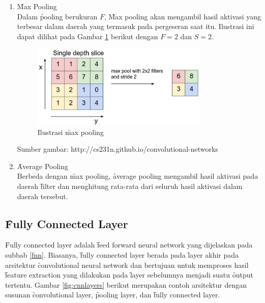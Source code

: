 \begin{enumerate}
	\item \f{Max Pooling} \\
	Dalam \f{pooling} berukuran $F$, \f{Max pooling} akan mengambil hasil aktivasi yang terbesar dalam daerah yang termasuk pada pergeseran saat itu. Ilustrasi ini dapat dilihat pada Gambar \ref{fig:maxpool} berikut dengan $F = 2$ dan $S = 2$.
	
	\begin{figure}
		\centering
		\includegraphics[width=0.8\textwidth,height=0.35\textwidth]
		{pics/maxpool.jpeg}
		\caption{Ilustrasi \f{max pooling}}
		\label{fig:maxpool}
	\end{figure}
	\vspace{-1.2cm}
	\begin{center}
		{\small Sumber gambar: http://cs231n.github.io/convolutional-networks}
	\end{center}
	
	\item \f{Average Pooling} \\
	Berbeda dengan \f{max pooling}, \f{average pooling} mengambil hasil aktivasi pada daerah \f{filter} dan menghitung rata-rata dari seluruh hasil aktivasi dalam daerah tersebut.
\end{enumerate}
\subsection{\f{Fully Connected Layer}}
\f{Fully connected layer} adalah \f{feed forward neural network} yang dijelaskan pada subbab \ref{fnn}. Biasanya, \f{fully connected layer} berada pada \f{layer} akhir pada arsitektur \f{convolutional neural network} dan bertujuan untuk memproses hasil \f{feature extraction} yang dilakukan pada \f{layer} sebelumnya menjadi suatu \f{output} tertentu. Gambar \ref{fig:cnnlayers} berikut merupakan contoh arsitektur dengan susunan \f{convolutional layer}, \f{pooling layer}, dan \f{fully connected layer}.

